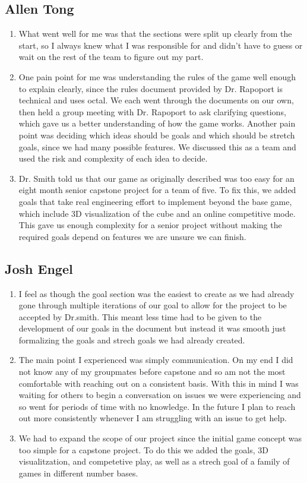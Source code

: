 \documentclass{article}
\begin{document}
\subsection*{Allen Tong}

\begin{enumerate}
    \item What went well for me was that the sections were split up clearly from the start, so I always knew what I was responsible for and didn't have to guess or wait on the rest of the team to figure out my part.
    \item One pain point for me was understanding the rules of the game well enough to explain clearly, since the rules document provided by Dr. Rapoport is technical and uses octal. We each went through the documents on our own, then held a group meeting with Dr. Rapoport to ask clarifying questions, which gave us a better understanding of how the game works. Another pain point was deciding which ideas should be goals and which should be stretch goals, since we had many possible features. We discussed this as a team and used the risk and complexity of each idea to decide.
    \item Dr. Smith told us that our game as originally described was too easy for an eight month senior capstone project for a team of five. To fix this, we added goals that take real engineering effort to implement beyond the base game, which include 3D visualization of the cube and an online competitive mode. This gave us enough complexity for a senior project without making the required goals depend on features we are unsure we can finish. 
\end{enumerate}

\subsection*{Josh Engel}

\begin{enumerate}
    \item I feel as though the goal section was the easiest to create as we had already gone through multiple iterations of our goal to allow for the project to be accepted by Dr.smith.
    This meant less time had to be given to the development of our goals in the document but instead it was smooth just formalizing the goals and strech goals we had already created.
    \item The main point I experienced was simply communication. On my end I did not know any of my groupmates before capstone and so am not the most comfortable with reaching out on a consistent basis.
    With this in mind I was waiting for others to begin a conversation on issues we were experiencing and so went for periods of time with no knowledge. In the future I plan to reach out more consistently 
    whenever I am struggling with an issue to get help.
    \item We had to expand the scope of our project since the initial game concept was too simple for a capstone project. To do this we added the goals, 3D visualitzation, and competetive play, 
    as well as a strech goal of a family of games in different number bases.
\end{enumerate}  
\end{document}
